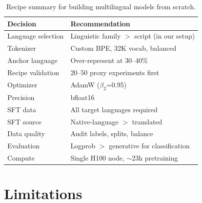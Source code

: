 \documentclass[10pt,twocolumn]{article}
\begin{document}
\begin{table}[H]
\centering\scriptsize
\begin{tabular}{lp{4cm}}
\toprule
\textbf{Decision} & \textbf{Recommendation} \\
\midrule
Language selection & Linguistic family $>$ script (in our setup) \\
Tokenizer & Custom BPE, 32K vocab, balanced \\
Anchor language & Over-represent at 30--40\% \\
Recipe validation & 20--50 proxy experiments first \\
Optimizer & AdamW ($\beta_2$=0.95) \\
Precision & bfloat16 \\
SFT data & All target languages required \\
SFT source & Native-language $>$ translated \\
Data quality & Audit labels, splits, balance \\
Evaluation & Logprob $>$ generative for classification \\
Compute & Single H100 node, $\sim$23h pretraining \\
\bottomrule
\end{tabular}
\caption{Recipe summary for building multilingual models from scratch.}
\label{tab:recipe}
\end{table}

\section{Limitations}
\label{sec:limitations}
\end{document}
